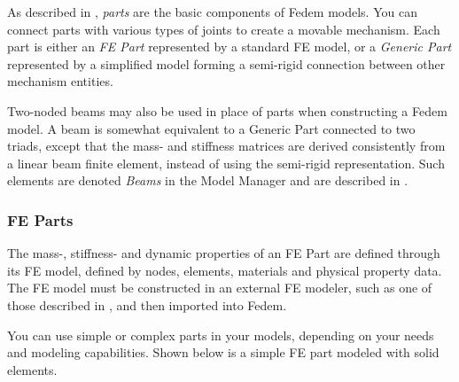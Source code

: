 %
%

%
%


As described in ,
{\sl parts} are the basic components of Fedem models. You can connect parts
with various types of joints to create a movable mechanism.
Each part is either an {\sl FE Part} represented by a standard FE model,
or a {\sl Generic Part} represented by a simplified model forming a semi-rigid
connection between other mechanism entities.

Two-noded beams may also be used in place of parts when constructing
a Fedem model. A beam is somewhat equivalent to a Generic Part connected
to two triads, except that the mass- and stiffness matrices are derived
consistently from a linear beam finite element,
instead of using the semi-rigid representation.
Such elements are denoted {\sl Beams} in the Model Manager and are described in
.


\subsubsection{FE Parts}

The mass-, stiffness- and dynamic properties of an FE Part are defined
through its FE model, defined by nodes, elements, materials and physical
property data. The FE model must be constructed in an external FE modeler,
such as one of those described in ,
and then imported into Fedem.

You can use simple or complex parts in your models, depending on your needs and
modeling capabilities.
Shown below is a simple FE part modeled with solid elements.


